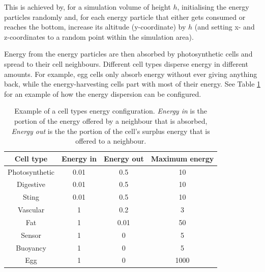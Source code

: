 This is achieved by, for a simulation volume of height \(h\), initialising the energy particles randomly and, for each energy particle that either gets consumed or reaches the bottom, increase its altitude (y-coordinate) by \(h\) (and setting x- and z-coordinates to a random point within the simulation area).

Energy from the energy particles are then absorbed by photosynthetic cells and spread to their cell neighbours. Different cell types disperse energy in different amounts. For example, egg cells only absorb energy without ever giving anything back, while the energy-harvesting cells part with most of their energy. See Table \ref{tab:cellEnergies} for an example of how the energy dispersion can be configured.

\begin{table}[H]
 \begin{tabular}{| c || c | c | c|} 
    \hline
     Cell type & Energy in & Energy out & Maximum energy \\ [0.5ex] 
     \hline\hline
     Photosynthetic & 0.01 & 0.5 & 10 \\ \hline
     Digestive & 0.01 & 0.5 & 10 \\ \hline
     Sting & 0.01 & 0.5 & 10 \\ \hline
     Vascular & 1 & 0.2 & 3 \\ \hline
     Fat & 1 & 0.01 & 50 \\ \hline
     Sensor & 1 & 0 & 5 \\ \hline
     Buoyancy & 1 & 0 & 5 \\ \hline
     Egg & 1 & 0 & 1000 \\ \hline
 \end{tabular}
\caption{Example of a cell types energy configuration. \emph{Energy in} is the portion of the energy offered by a neighbour that is absorbed,  \emph{Energy out} is the the portion of the cell's surplus energy that is offered to a neighbour.}
\label{tab:cellEnergies}
\end{table}



